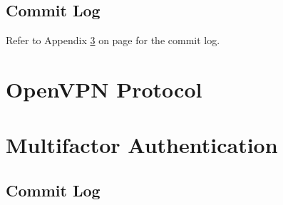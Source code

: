 \documentclass[11pt,oneside]{book}
\begin{document}
\section{Commit Log}
Refer to Appendix \ref{MFA:Commit} on page \pageref{MFA:Commit} for the commit log.

\appendix
\chapter{OpenVPN Protocol}
\label{OpenVPN:Protocol}


\chapter{Multifactor Authentication}
\label{MFA:Commit}
\section{Commit Log}





\printindex
{}

\begin{verbatim}










\end{verbatim}
\end{document}
